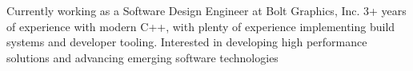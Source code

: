 

\begin{cvparagraph}

Currently working as a Software Design Engineer at Bolt Graphics, Inc.
3+ years of experience with modern C++, with plenty of experience implementing build systems and developer tooling.
Interested in developing high performance solutions and advancing emerging software technologies
\end{cvparagraph}
